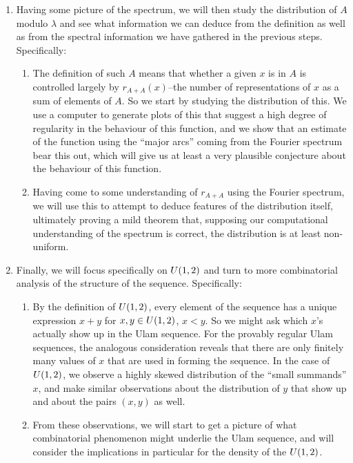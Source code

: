 \documentclass{report}
\theoremstyle{remark}
\numberwithin{equation}{section}
\begin{document}
\begin{enumerate}
\item Having some picture of the spectrum, we will then study the
  distribution of $A$ modulo $\lambda$ and see what information we can
  deduce from the definition as well as from the spectral information
  we have gathered in the previous steps.  Specifically:
  \begin{enumerate}
  \item The definition of such $A$ means that whether a given $x$ is
    in $A$ is controlled largely by $r_{A+A}(x)$--the number of
    representations of $x$ as a sum of elements of $A$.  So we start
    by studying the distribution of this.  We use a computer to
    generate plots of this that suggest a high degree of regularity in
    the behaviour of this function, and we show that an estimate of
    the function using the ``major arcs'' coming from the Fourier
    spectrum bear this out, which will give us at least a very
    plausible conjecture about the behaviour of this function.
  \item Having come to some understanding of $r_{A+A}$ using the
    Fourier spectrum, we will use this to attempt to deduce features
    of the distribution itself, ultimately proving a mild theorem
    that, supposing our computational understanding of the spectrum is
    correct, the distribution is at least non-uniform.
  \end{enumerate}

\item Finally, we will focus specifically on $U(1,2)$ and turn to
  more combinatorial analysis of the structure of the sequence.
  Specifically: 
  \begin{enumerate}
  \item By the definition of $U(1,2)$, every element of the
    sequence has a unique expression $x+y$ for $x, y \in U(1,2)$,
    $x < y$.  So we might ask which $x$'s actually show up in the Ulam
    sequence.  For the provably regular Ulam sequences, the analogous
    consideration reveals that there are only finitely many values of
    $x$ that are used in forming the sequence.  In the case of
    $U(1,2)$, we observe a highly skewed distribution of the
    ``small summands'' $x$, and make similar observations about the
    distribution of $y$ that show up and about the pairs $(x, y)$ as
    well.
  \item From these observations, we will start to get a picture of
    what combinatorial phenomenon might underlie the Ulam sequence, and
    will consider the implications in particular for the density of
    the $U(1,2)$.
  \end{enumerate}
\end{enumerate}
\end{document}
